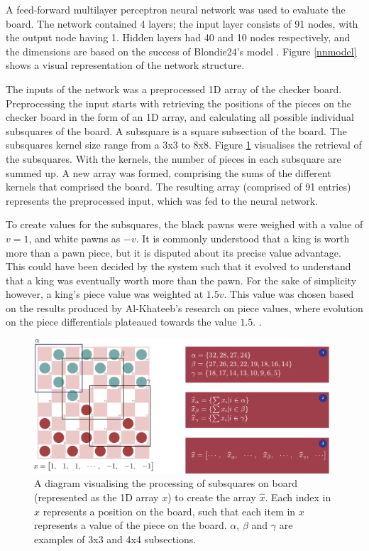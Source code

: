 \documentclass[12pt,a4paper]{article}
\begin{document}
        A feed-forward multilayer perceptron neural network was used to evaluate the board. The network contained 4 layers; the input layer consists of 91 nodes, with the output node having 1. Hidden layers had 40 and 10 nodes respectively, and the dimensions are based on the success of Blondie24's model \cite{chellapilla_evolving_1999}. Figure \ref{nnmodel} shows a visual representation of the network structure.

        The inputs of the network was a preprocessed 1D array of the checker board. Preprocessing the input starts with retrieving the positions of the pieces on the checker board in the form of an 1D array, and calculating all possible individual subsquares of the board. A subsquare is a square subsection of the board. The subsquares kernel size range from a 3x3 to 8x8. Figure \ref{subsquares} visualises the retrieval of the subsquares. With the kernels, the number of pieces in each subsquare are summed up. A new array was formed, comprising the sums of the different kernels that comprised the board. The resulting array (comprised of 91 entries) represents the preprocessed input, which was fed to the neural network.
        
        To create values for the subsquares, the black pawns were weighed with a value of $v=1$, and white pawns as $-v$. It is commonly understood that a king is worth more than a pawn piece, but it is disputed about its precise value advantage. This could have been decided by the system such that it evolved to understand that a king was eventually worth more than the pawn. For the sake of simplicity however, a king's piece value was weighted at $1.5v$. This value was chosen based on the results produced by Al-Khateeb's research on piece values, where evolution on the piece differentials plateaued towards the value $1.5$. \cite{al-khateeb_importance_2010}.

        \begin{figure}[!ht]
            \centering
            \includegraphics[width=110mm]{images/subsquares.pdf}
            \caption{A diagram visualising the processing of subsquares on board (represented as the 1D array $x$) to create the array $\widehat{x}$. Each index in $x$ represents a position on the board, such that each item in $x$ represents a value of the piece on the board. $\alpha$, $\beta$ and $\gamma$ are examples of 3x3 and 4x4 subsections. \label{subsquares}}
        \end{figure}
\end{document}
